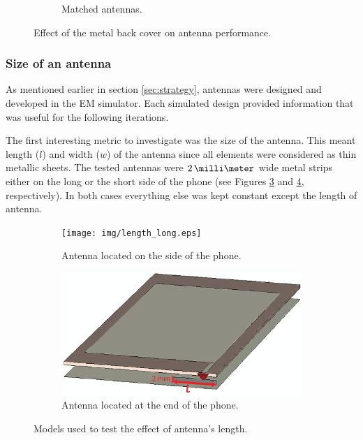 \begin{figure}[H]
\begin{subfigure}[b]{0.49\textwidth}
        \caption{Matched antennas.}
        \label{fig:metal_vs_nometal_matched}
    \end{subfigure}
    \caption{Effect of the metal back cover on antenna performance.}
    \label{fig:metal_vs_nometal_results}
\end{figure}



\subsubsection{Size of an antenna}
\label{sec:antenna_size}
As mentioned earlier in section \ref{sec:strategy}, antennas were designed and developed in the EM simulator. Each simulated design provided information that was useful for the following iterations. 

The first interesting metric to investigate was the size of the antenna. This meant length ($l$) and width ($w$) of the antenna since all elements were considered as thin metallic sheets. The tested antennas were $2\,\milli\meter$ wide metal strips either on the long or the short side of the phone (see Figures \ref{fig:ant_length_long} and \ref{fig:ant_length_short}, respectively). In both cases everything else was kept constant except the length of antenna. 

\begin{figure}[H]
    \centering
    \begin{subfigure}[b]{0.49\textwidth}
        \texttt{[image: img/length\_long.eps]}
        \caption{Antenna located on the side of the phone.}
        \label{fig:ant_length_long}
    \end{subfigure}
    
    \begin{subfigure}[b]{0.49\textwidth}
        \includegraphics[width=\textwidth]{img/length_short.eps}
        \caption{Antenna located at the end of the phone.}
        \label{fig:ant_length_short}
    \end{subfigure}
    \caption{Models used to test the effect of antenna's length.}
    \label{fig:ant_length_model}
\end{figure}


